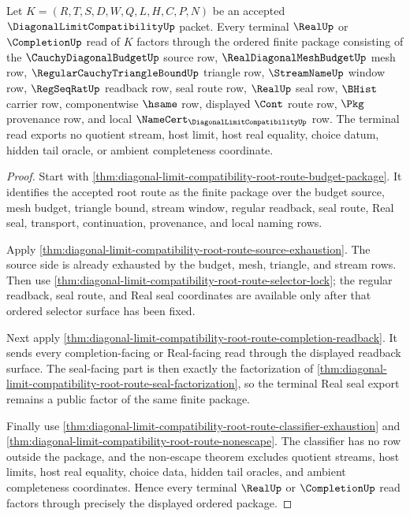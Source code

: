 \begin{theorem}
\label{thm:diagonal-limit-compatibility-terminal-budget-factorization}
Let $K=(R,T,S,D,W,Q,L,H,C,P,N)$ be an accepted $\DiagonalLimitCompatibilityUp$ packet. Every terminal $\RealUp$ or $\CompletionUp$ read of $K$ factors through the ordered finite package consisting of the $\CauchyDiagonalBudgetUp$ source row, $\RealDiagonalMeshBudgetUp$ mesh row, $\RegularCauchyTriangleBoundUp$ triangle row, $\StreamNameUp$ window row, $\RegSeqRatUp$ readback row, seal route row, $\RealUp$ seal row, $\BHist$ carrier row, componentwise $\hsame$ row, displayed $\Cont$ route row, $\Pkg$ provenance row, and local $\NameCert_{\DiagonalLimitCompatibilityUp}$ row. The terminal read exports no quotient stream, host limit, host real equality, choice datum, hidden tail oracle, or ambient completeness coordinate.
\end{theorem}
\begin{proof}
Start with \autoref{thm:diagonal-limit-compatibility-root-route-budget-package}. It identifies the accepted root route as the finite package over the budget source, mesh budget, triangle bound, stream window, regular readback, seal route, Real seal, transport, continuation, provenance, and local naming rows.

Apply \autoref{thm:diagonal-limit-compatibility-root-route-source-exhaustion}. The source side is already exhausted by the budget, mesh, triangle, and stream rows. Then use \autoref{thm:diagonal-limit-compatibility-root-route-selector-lock}; the regular readback, seal route, and Real seal coordinates are available only after that ordered selector surface has been fixed.

Next apply \autoref{thm:diagonal-limit-compatibility-root-route-completion-readback}. It sends every completion-facing or Real-facing read through the displayed readback surface. The seal-facing part is then exactly the factorization of \autoref{thm:diagonal-limit-compatibility-root-route-seal-factorization}, so the terminal Real seal export remains a public factor of the same finite package.

Finally use \autoref{thm:diagonal-limit-compatibility-root-route-classifier-exhaustion} and \autoref{thm:diagonal-limit-compatibility-root-route-nonescape}. The classifier has no row outside the package, and the non-escape theorem excludes quotient streams, host limits, host real equality, choice data, hidden tail oracles, and ambient completeness coordinates. Hence every terminal $\RealUp$ or $\CompletionUp$ read factors through precisely the displayed ordered package.
\end{proof}

